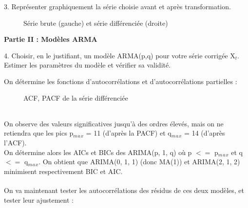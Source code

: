 \documentclass[a4paper, 12pt]{article} %
\begin{document}
\begin{tcolorbox}
{\normalsize
3. Représenter graphiquement la série choisie avant et après transformation.
}
\end{tcolorbox}
\begin{figure}[h]
    \centering
    \caption{Série brute (gauche) et série différenciée (droite)}
\end{figure}
\Large{\textbf{Partie II : Modèles ARMA}}
\begin{tcolorbox}
{\normalsize
4. Choisir, en le justifiant, un modèle ARMA(p,q) pour votre série corrigée X$_t$. Estimer les paramètres
du modèle et vérifier sa validité.
}
\end{tcolorbox}
{\small
{On détermine les fonctions d'autocorrélations et d'autocorrélations partielles :
}}
\begin{figure}[h]
    \centering
    \caption{ACF, PACF de la série différenciée}
\end{figure}
\newpage
\small{
{\\On observe des valeurs significatives jusqu'à des ordres élevés, mais on ne retiendra que les pics p$_m$$_a$$_x$ = 11 (d'après la PACF) et q$_m$$_a$$_x$ = 14 (d'après l'ACF).\\On détermine alors les AICs et BICs des ARIMA(p, 1, q) où p $<=$ p$_m$$_a$$_x$ et q $<=$ q$_m$$_a$$_x$. On obtient que ARIMA(0, 1, 1) (donc MA(1)) et ARIMA(2, 1, 2) minimisent respectivement BIC et AIC.\\ \\On va maintenant tester les autocorrélations des résidus de ces deux modèles, et tester leur ajustement :
}}
\end{document}
